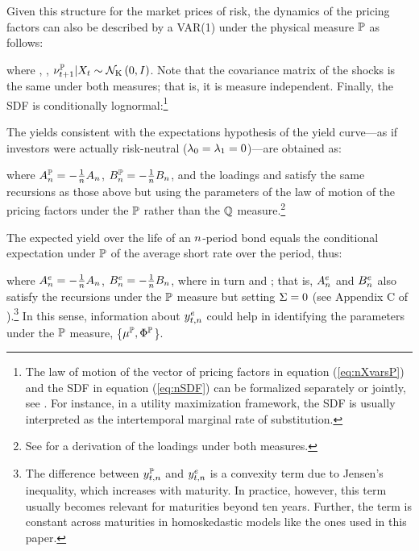 {Given this structure for the market prices of risk, the dynamics of the pricing factors can also be described by a VAR(1) under the physical measure \(\mathbb{P}\) as follows:
	
\noindent where , ,  \(\nu_{t+1}^{\mathbb{P}} | X_{t} \sim \mathcal{N}_{\mathrm{K}} \left(0,I\right)\). Note that the covariance matrix of the shocks is the same under both measures; that is, it is measure independent. 
Finally, the SDF is conditionally lognormal:\footnote{ The law of motion of the vector of pricing factors in equation (\ref{eq:nXvarsP}) and the SDF in equation (\ref{eq:nSDF}) can be formalized separately or jointly, see \cite{GurkaynakWright:2012}. For instance, in a utility maximization framework, the SDF is usually interpreted as the intertemporal marginal rate of substitution.}
	
The yields consistent with the expectations hypothesis of the yield curve---as if investors were actually risk-neutral (\(\lambda_{0} = \lambda_{1} = 0\))---are obtained as:
	
\noindent where \(A_{n}^{\mathbb{P}} = - \frac{1}{n} A_{n}\), \(B_{n}^{\mathbb{P}} = - \frac{1}{n} B_{n}\), and the loadings  and  satisfy the same recursions as those above but using the parameters of the law of motion of the pricing factors under the \(\mathbb{P}\) rather than the \(\mathbb{Q}\) measure.\footnote{ See \cite{Lloyd:2018b} for a derivation of the loadings under both measures.}

The expected yield over the life of an \(n\)-period bond equals the conditional expectation under \(\mathbb{P}\) of the average short rate over the period, thus:
	
\noindent where \(A_{n}^{e} = - \frac{1}{n} A_{n}\), \(B_{n}^{e} = - \frac{1}{n} B_{n}\), where in turn  and ; that is, \(A_{n}^{e}\) and \(B_{n}^{e}\) also satisfy the recursions under the \(\mathbb{P}\) measure but setting \(\Sigma = 0\) (see Appendix C of \cite{Guimaraes:2014}).\footnote{ The difference between \(y_{t,n}^{\mathbb{P}}\) and \(y_{t,n}^{e}\) is a convexity term due to Jensen's inequality, which increases with maturity. In practice, however, this term usually becomes relevant for maturities beyond ten years. Further, the term is constant across maturities in homoskedastic models like the ones used in this paper.}
In this sense, information about \(y_{t,n}^{e}\) could help in identifying the parameters under the \(\mathbb{P}\) measure, \{\(\mu^{\mathbb{P}}, \Phi^{\mathbb{P}}\)\}.

}
